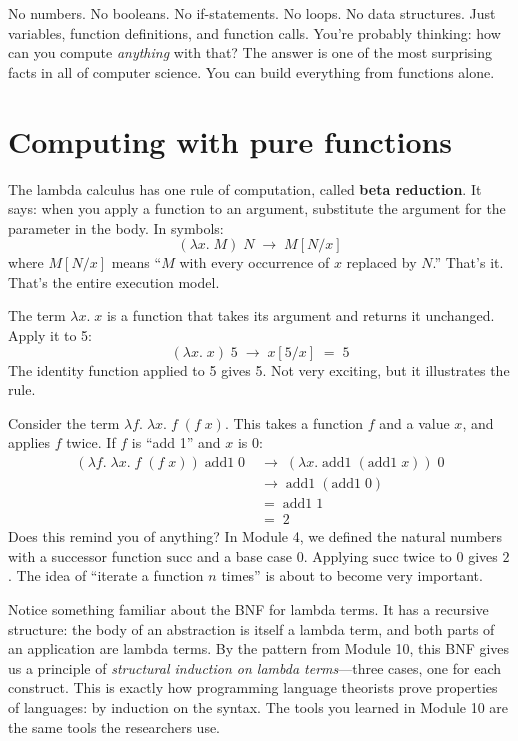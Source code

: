 \documentclass[11pt]{article}
\begin{document}
No numbers. No booleans. No if-statements. No loops. No data structures. Just variables, function definitions, and function calls. You're probably thinking: how can you compute \emph{anything} with that? The answer is one of the most surprising facts in all of computer science. You can build everything from functions alone.

\section{Computing with pure functions}

The lambda calculus has one rule of computation, called \textbf{beta reduction}. It says: when you apply a function to an argument, substitute the argument for the parameter in the body. In symbols:
\[
(\lambda x.\; M)\; N \;\longrightarrow\; M[N/x]
\]
where $M[N/x]$ means ``$M$ with every occurrence of $x$ replaced by $N$.'' That's it. That's the entire execution model.

\begin{example}
The term $\lambda x.\; x$ is a function that takes its argument and returns it unchanged. Apply it to 5:
\[
(\lambda x.\; x)\; 5 \;\longrightarrow\; x[5/x] \;=\; 5
\]
The identity function applied to 5 gives 5. Not very exciting, but it illustrates the rule.
\end{example}

\begin{example}
Consider the term $\lambda f.\; \lambda x.\; f\;(f\; x)$. This takes a function $f$ and a value $x$, and applies $f$ twice. If $f$ is ``add 1'' and $x$ is $0$:
\begin{align*}
(\lambda f.\; \lambda x.\; f\;(f\; x))\;\text{add1}\; 0
  &\;\longrightarrow\; (\lambda x.\; \text{add1}\;(\text{add1}\; x))\; 0 \\
  &\;\longrightarrow\; \text{add1}\;(\text{add1}\; 0) \\
  &\;=\; \text{add1}\; 1 \\
  &\;=\; 2
\end{align*}
Does this remind you of anything? In Module 4, we defined the natural numbers with a successor function $\text{succ}$ and a base case $0$. Applying $\text{succ}$ twice to $0$ gives $2$. The idea of ``iterate a function $n$ times'' is about to become very important.
\end{example}

Notice something familiar about the BNF for lambda terms. It has a recursive structure: the body of an abstraction is itself a lambda term, and both parts of an application are lambda terms. By the pattern from Module 10, this BNF gives us a principle of \emph{structural induction on lambda terms}---three cases, one for each construct. This is exactly how programming language theorists prove properties of languages: by induction on the syntax. The tools you learned in Module 10 are the same tools the researchers use.
\end{document}
